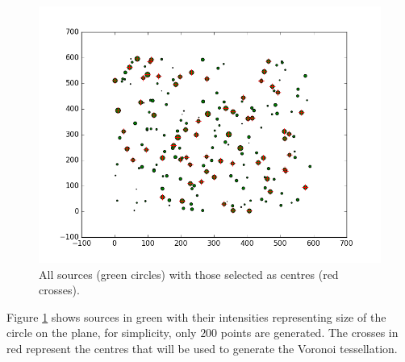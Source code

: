 \begin{figure}[H]
\includegraphics[width=\textwidth]{Images/sources.png}
\caption{ All sources (green circles) with those selected as centres (red crosses).}
\label{fig:source}
\end{figure}
Figure \ref{fig:source} shows sources in green with their intensities representing size of the circle on the plane, for simplicity, only $200$ points are generated. The crosses in red represent the centres that will be used to generate the Voronoi tessellation.